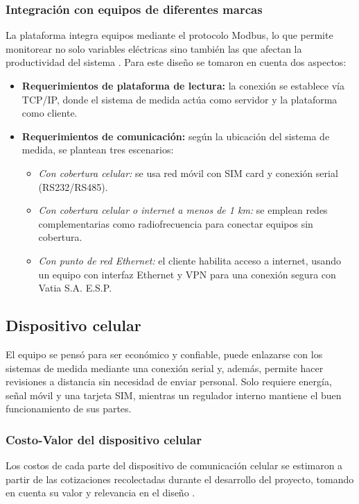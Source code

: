 \subsubsection{Integración con equipos de diferentes marcas}
La plataforma integra equipos mediante el protocolo Modbus, lo que permite monitorear no solo variables eléctricas sino también las que afectan la productividad del sistema \cite{Jaramillo2022}. Para este diseño se tomaron en cuenta dos aspectos:
\begin{itemize}
    \item \textbf{Requerimientos de plataforma de lectura:} la conexión se establece vía TCP/IP, donde el sistema de medida actúa como servidor y la plataforma como cliente.
    \item \textbf{Requerimientos de comunicación:} según la ubicación del sistema de medida, se plantean tres escenarios:
    \begin{itemize}
        \item \textit{Con cobertura celular:} se usa red móvil con SIM card y conexión serial (RS232/RS485).
        \item \textit{Con cobertura celular o internet a menos de 1 km:} se emplean redes complementarias como radiofrecuencia para conectar equipos sin cobertura.
        \item \textit{Con punto de red Ethernet:} el cliente habilita acceso a internet, usando un equipo con interfaz Ethernet y VPN para una conexión segura con Vatia S.A. E.S.P.
    \end{itemize}
\end{itemize}

\subsection{Dispositivo celular}
El equipo se pensó para ser económico y confiable, puede enlazarse con los sistemas de medida mediante una conexión serial y, además, permite hacer revisiones a distancia sin necesidad de enviar personal. Solo requiere energía, señal móvil y una tarjeta SIM, mientras un regulador interno mantiene el buen funcionamiento de sus partes.

\subsubsection{Costo-Valor del dispositivo celular}
Los costos de cada parte del dispositivo de comunicación celular se estimaron a partir de las cotizaciones recolectadas durante el desarrollo del proyecto, tomando en cuenta su valor y relevancia en el diseño \cite{Jaramillo2022}.

